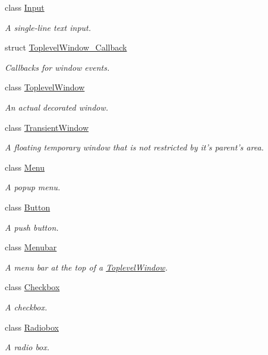 \begin{DoxyCompactItemize}
class \hyperlink{classGUI_1_1Input}{Input}
\begin{DoxyCompactList}\small\item\em A single-\/line text input. \end{DoxyCompactList}\item 
struct \hyperlink{structGUI_1_1ToplevelWindow__Callback}{Toplevel\-Window\-\_\-\-Callback}
\begin{DoxyCompactList}\small\item\em Callbacks for window events. \end{DoxyCompactList}\item 
class \hyperlink{classGUI_1_1ToplevelWindow}{Toplevel\-Window}
\begin{DoxyCompactList}\small\item\em An actual decorated window. \end{DoxyCompactList}\item 
class \hyperlink{classGUI_1_1TransientWindow}{Transient\-Window}
\begin{DoxyCompactList}\small\item\em A floating temporary window that is not restricted by it's parent's area. \end{DoxyCompactList}\item 
class \hyperlink{classGUI_1_1Menu}{Menu}
\begin{DoxyCompactList}\small\item\em A popup menu. \end{DoxyCompactList}\item 
class \hyperlink{classGUI_1_1Button}{Button}
\begin{DoxyCompactList}\small\item\em A push button. \end{DoxyCompactList}\item 
class \hyperlink{classGUI_1_1Menubar}{Menubar}
\begin{DoxyCompactList}\small\item\em A menu bar at the top of a \hyperlink{classGUI_1_1ToplevelWindow}{Toplevel\-Window}. \end{DoxyCompactList}\item 
class \hyperlink{classGUI_1_1Checkbox}{Checkbox}
\begin{DoxyCompactList}\small\item\em A checkbox. \end{DoxyCompactList}\item 
class \hyperlink{classGUI_1_1Radiobox}{Radiobox}
\begin{DoxyCompactList}\small\item\em A radio box. \end{DoxyCompactList}\item 

\end{DoxyCompactItemize}
